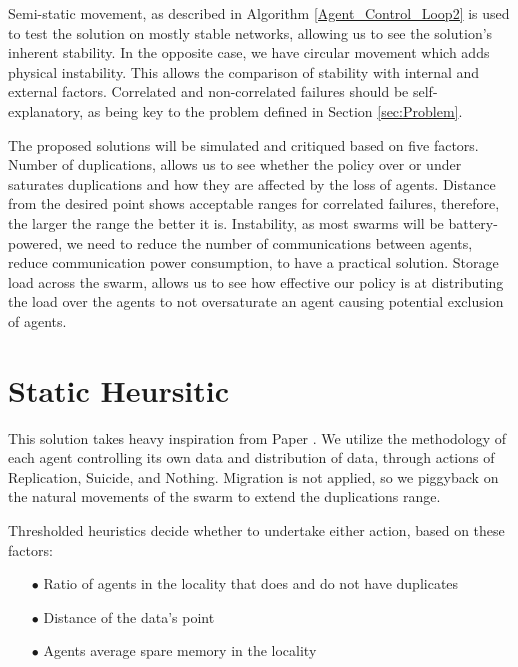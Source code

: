 \documentclass{UoYCSproject}
\begin{document}
Semi-static movement, as described in Algorithm \ref{Agent_Control_Loop2} is used to test the solution on mostly stable networks, allowing us to see the solution's inherent stability.
In the opposite case, we have circular movement which adds physical instability.
This allows the comparison of stability with internal and external factors.
Correlated and non-correlated failures should be self-explanatory, as being key to the problem defined in Section \ref{sec:Problem}.

The proposed solutions will be simulated and critiqued based on five factors.
Number of duplications, allows us to see whether the policy over or under saturates duplications and how they are affected by the loss of agents.
Distance from the desired point shows acceptable ranges for correlated failures, therefore, the larger the range the better it is.
Instability, as most swarms will be battery-powered, we need to reduce the number of communications between agents, reduce communication power consumption, to have a practical solution.
Storage load across the swarm, allows us to see how effective our policy is at distributing the load over the agents to not oversaturate an agent causing potential exclusion of agents.


\section{Static Heursitic}
\label{sec:Simple2}

This solution takes heavy inspiration from Paper \cite{Distributed Storage}.
We utilize the methodology of each agent controlling its own data and distribution of data, through actions of Replication, Suicide, and Nothing.
Migration is not applied, so we piggyback on the natural movements of the swarm to extend the duplications range.

Thresholded heuristics decide whether to undertake either action, based on these factors:

\begin{itemize}
\itemsep-1em
\item[$\bullet$] Ratio of agents in the locality that does and do not have duplicates
\item[$\bullet$] Distance of the data’s point
\item[$\bullet$] Agents average spare memory in the locality
\end{itemize}
\end{document}
